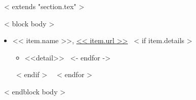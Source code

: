 ~< extends "section.tex" >~

~< block body >~
  \begin{itemize}
    ~< for item in items >~
      \item << item.name >>, \href{https://scholar.google.com/citations?user=<< item.url >>}{<< item.url >>}
        ~< if item.details >~
        \iftrue
        \begin{itemize}
          ~< for detail in item.details ->~
            \item <<detail>>
          ~<- endfor ->~
        \end{itemize}
        \fi
        ~< endif >~
    ~< endfor >~
  \end{itemize}
~< endblock body >~

